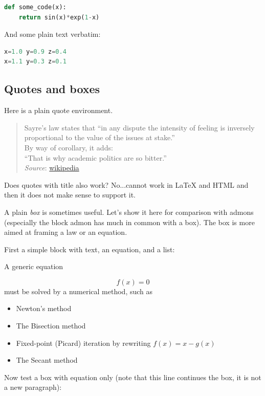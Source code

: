 \documentclass[%
oneside,                 %
final,                   %
10pt]{article}
\begin{document}
\begin{lstlisting}[language=python,style=simple,xleftmargin=2mm]
def some_code(x):
    return sin(x)*exp(1-x)

\end{lstlisting}


And some plain text verbatim:




\begin{lstlisting}[language=Python,style=simple,xleftmargin=2mm]
x=1.0 y=0.9 z=0.4
x=1.1 y=0.3 z=0.1

\end{lstlisting}


\subsection{Quotes and boxes}

Here is a plain quote environment.


\begin{quote}
Sayre's law states that
``in any dispute the intensity of feeling is inversely
proportional to the value of the issues at stake.'' \\
By way of corollary, it adds: \\
``That is why academic politics are so bitter.'' \\
\emph{Source}: \href{{https://en.wikipedia.org/wiki/Sayre's_law}}{wikipedia}
\end{quote}


Does quotes with title also work? No...cannot work in {\LaTeX} and HTML
and then it does not make sense to support it.

A plain \emph{box} is sometimes useful. Let's show it here for comparison
with admons (especially the block admon has much in common with a box).
The box is more aimed at framing a law or an equation.

First a simple block with text, an equation, and a list:


\begin{center}
\begin{Sbox}
\begin{minipage}{0.85\linewidth}
A generic equation

\[ f(x) = 0 \]
must be solved by a numerical method, such as

\begin{itemize}
 \item Newton's method

 \item The Bisection method

 \item Fixed-point (Picard) iteration by rewriting $f(x)=x - g(x)$

 \item The Secant method
\end{itemize}

\noindent
\end{minipage}
\end{Sbox}
\fbox{\TheSbox}
\end{center}
Now test a box with equation only (note that this line continues the
box, it is not a new paragraph):
\end{document}
